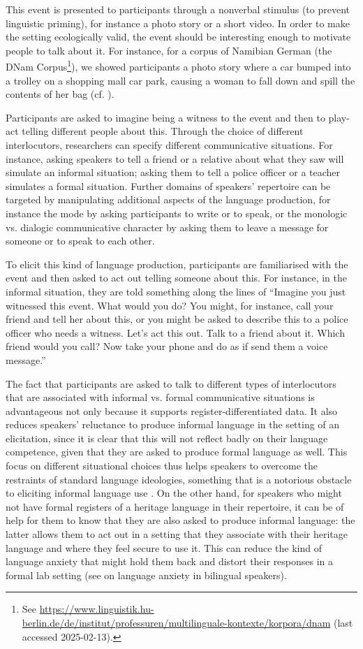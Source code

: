 \documentclass[output=paper,colorlinks,citecolor=brown]{langscibook}
\begin{document}
This event is presented to participants through a nonverbal stimulus (to prevent linguistic priming), for instance a photo story or a short video. In order to make the setting ecologically valid, the event should be interesting enough to motivate people to talk about it. For instance, for a corpus of Namibian German (the DNam Corpus\footnote{See \url{https://www.linguistik.hu-berlin.de/de/institut/professuren/multilinguale-kontexte/korpora/dnam} (last accessed 2025-02-13).}), we showed participants a photo story where a car bumped into a trolley on a shopping mall car park, causing a woman to fall down and spill the contents of her bag (cf. \citealt{wieseetal2017, zimmeretal2020}).

Participants are asked to imagine being a witness to the event and then to play-act telling different people about this. Through the choice of different interlocutors, researchers can specify different communicative situations. For instance, asking speakers to tell a friend or a relative about what they saw will simulate an informal situation; asking them to tell a police officer or a teacher simulates a formal situation. Further domains of speakers’ repertoire can be targeted by manipulating additional aspects of the language production, for instance the mode by asking participants to write or to speak, or the monologic vs. dialogic communicative character by asking them to leave a message for someone or to speak to each other.

To elicit this kind of language production, participants are familiarised with the event and then asked to act out telling someone about this. For instance, in the informal situation, they are told something along the lines of “Imagine you just witnessed this event. What would you do? You might, for instance, call your friend and tell her about this, or you might be asked to describe this to a police officer who needs a witness. Let’s act this out. Talk to a friend about it. Which friend would you call? Now take your phone and do as if send them a voice message.” 

The fact that participants are asked to talk to different types of interlocutors that are associated with informal vs. formal communicative situations is advantageous not only because it supports register-differentiated data. It also reduces speakers’ reluctance to produce informal language in the setting of an elicitation, since it is clear that this will not reflect badly on their language competence, given that they are asked to produce formal language as well. This focus on different situational choices thus helps speakers to overcome the restraints of standard language ideologies, something that is a notorious obstacle to eliciting informal language use \citep{wiese2020}. On the other hand, for speakers who might not have formal registers of a heritage language in their repertoire, it can be of help for them to know that they are also asked to produce informal language: the latter allows them to act out in a setting that they associate with their heritage language and where they feel secure to use it. This can reduce the kind of language anxiety that might hold them back and distort their responses in a formal lab setting (see \cite{sevincdewaele2018} on language anxiety in bilingual speakers).
\end{document}
